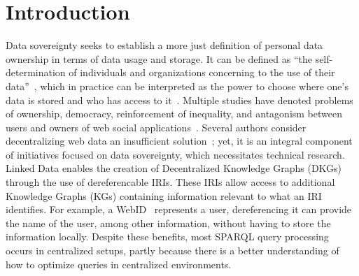 \section{Introduction}

Data sovereignty seeks to establish a more just definition of personal data ownership in terms of data usage and storage.
It can be defined as ``the self-determination of individuals and organizations concerning to the use of their data''~\cite{verstraete2022solid},
which in practice can be interpreted as the power to choose where one's data is stored and who has access to it~\cite{verstraete2022solid}.
Multiple studies have denoted problems of ownership, democracy, reinforcement of inequality, and antagonism between users and owners of web social applications~\cite{Terranova2000FreeLP, Curran2016ch1, Sevignani2013, 9663788}.
Several authors consider decentralizing web data an insufficient solution~\cite{9663788, Curran2016ch1}; yet, it is an integral component of initiatives focused on data sovereignty,
which necessitates technical research.
Linked Data enables the creation of Decentralized Knowledge Graphs (DKGs) through the use of dereferencable IRIs.
These IRIs allow access to additional Knowledge Graphs (KGs) containing information relevant to what an IRI identifies.
For example, a WebID~ represents a user, dereferencing it can provide the name of the user, among other information, without having to store the information locally.
Despite these benefits, most SPARQL query processing occurs in centralized setups, partly because there is a better understanding of how to optimize queries in centralized environments.

